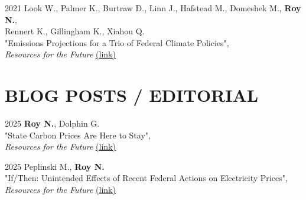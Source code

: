 \documentclass[margin]{res}
\begin{document}
\begin{resume}
2021 \hspace{4mm}%
    Look W., Palmer K., Burtraw D., Linn J., Hafstead M., Domeshek M., \textbf{Roy N.}, \\
    \hspace*{11mm}  Rennert K., Gillingham K., Xiahou Q. \\
    \hspace*{16mm} 
    "Emissions Projections for a Trio of Federal Climate Policies",
    \\
    \hspace*{16mm} \textit{Resources for the Future} \href{https://www.rff.org/publications/issue-briefs/emissions-projections-for-a-trio-of-federal-climate-policies/} {(link)} 



\section{BLOG POSTS / EDITORIAL} 

2025 \hspace{4mm}%
    \textbf{Roy N.}, Dolphin G. \\
    \hspace*{16mm}
    "State Carbon Prices Are Here to Stay", \\
    \hspace*{16mm} \textit{Resources for the Future} \href{https://www.resources.org/common-resources/state-carbon-prices-are-here-to-stay/}{(link)} %

2025 \hspace{4mm}%
    Peplinski M., \textbf{Roy N.} \\
    \hspace*{16mm}
    "If/Then: Unintended Effects of Recent Federal Actions on Electricity Prices", \\
    \hspace*{16mm} \textit{Resources for the Future} \href{https://www.resources.org/common-resources/if-then-unintended-effects-of-recent-federal-actions-on-electricity-prices/}{(link)} %


\end{resume}
\end{document}
